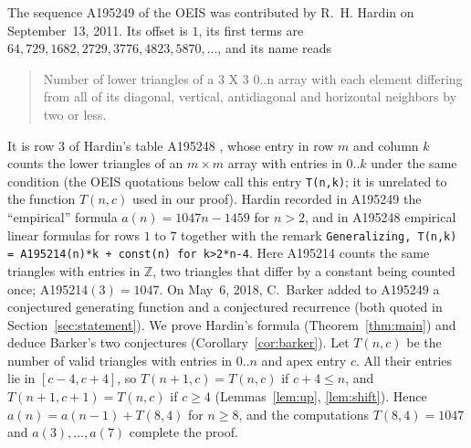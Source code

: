 \documentclass[11pt]{amsart}
\theoremstyle{plain}
\theoremstyle{definition}
\newcommand{\Z}{\mathbb{Z}}
\begin{document}
The sequence A195249 of the OEIS \cite{A195249} was contributed by R.~H. Hardin on September~13, 2011. Its offset is $1$, its first terms are $64, 729, 1682, 2729, 3776, 4823, 5870,\dots$, and its name reads
\begin{quote}
\small Number of lower triangles of a 3 X 3 0..n array with each element differing from all of its diagonal, vertical, antidiagonal and horizontal neighbors by two or less.
\end{quote}
It is row $3$ of Hardin's table A195248 \cite{A195248}, whose entry in row $m$ and column $k$ counts the lower triangles of an $m\times m$ array with entries in $0..k$ under the same condition (the OEIS quotations below call this entry \texttt{T(n,k)}; it is unrelated to the function $T(n,c)$ used in our proof).
Hardin recorded in A195249 the ``empirical'' formula $a(n)=1047n-1459$ for $n>2$, and in A195248 empirical linear formulas for rows $1$ to $7$ together with the remark \texttt{Generalizing, T(n,k) = A195214(n)*k + const(n) for k>2*n-4}. Here A195214 \cite{A195214} counts the same triangles with entries in $\Z$, two triangles that differ by a constant being counted once; A195214$(3)=1047$.
On May~6, 2018, C.~Barker added to A195249 a conjectured generating function and a conjectured recurrence (both quoted in Section~\ref{sec:statement}).
We prove Hardin's formula (Theorem~\ref{thm:main}) and deduce Barker's two conjectures (Corollary~\ref{cor:barker}).
Let $T(n,c)$ be the number of valid triangles with entries in $0..n$ and apex entry $c$. All their entries lie in $[c-4,c+4]$, so $T(n+1,c)=T(n,c)$ if $c+4\le n$, and $T(n+1,c+1)=T(n,c)$ if $c\ge4$ (Lemmas~\ref{lem:up}, \ref{lem:shift}). Hence $a(n)=a(n-1)+T(8,4)$ for $n\ge8$, and the computations $T(8,4)=1047$ and $a(3),\dots,a(7)$ complete the proof.
\end{document}
